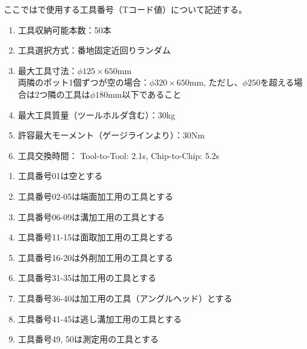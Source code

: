 

ここでは\DMname で使用する工具番号（Tコード値）について記述する。


\begin{enumerate}[label=\Roman*), ref=\Roman*)]
\item 工具収納可能本数：50本
\item 工具選択方式：番地固定近回りランダム
\item 最大工具寸法：$\phi125\times650$mm\\
両隣のポット1個ずつが空の場合：$\phi320\times650$mm, ただし、$\phi250$を超える場合は2つ隣の工具は$\phi180$mm以下であること
\item 最大工具質量（ツールホルダ含む）：30kg
\item 許容最大モーメント（ゲージラインより）：30Nm
\item 工具交換時間： Tool-to-Tool: 2.1s, Chip-to-Chip: 5.2s
\end{enumerate}

\begin{enumerate}[label=\roman*), ref=\roman*)]
\item 工具番号01は空とする
\item 工具番号02-05は端面加工用の工具とする
\item 工具番号06-09は溝加工用の工具とする
\item 工具番号11-15は面取加工用の工具とする
\item 工具番号16-20は外削加工用の工具とする
\item 工具番号31-35は\dimple 加工用の工具とする
\item 工具番号36-40は\dimple 加工用の工具（アングルヘッド）とする
\item 工具番号41-45は逃し溝加工用の工具とする
\item 工具番号49, 50は測定用の工具とする
\end{enumerate}



